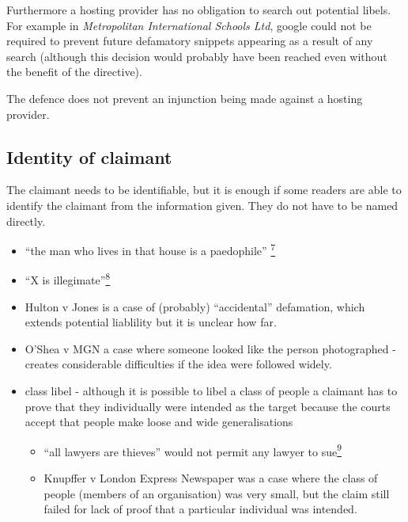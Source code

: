 \documentclass[]{article}
\begin{document}
Furthermore a hosting provider has no obligation to search out potential libels. For example in  \emph{Metropolitan International Schools Ltd}, google could not  be  required to prevent future defamatory snippets appearing as a result
  of any search (although this decision would probably have been reached
  even without the benefit of the directive).

The defence does not prevent an injunction being made against a hosting provider.

\subsection{Identity of claimant}

The claimant needs to be identifiable, but it is enough if some readers
are able to identify the claimant from the information given. They do
not have to be named directly.

\begin{itemize}
\item
  ``{the man who lives in that house is a paedophile''
  \hyperref[sdfootnote7sym]{\textsuperscript{7}}}
\item
  ``{X is illegimate''\hyperref[sdfootnote8sym]{\textsuperscript{8}}}
\item
  Hulton v Jones is a case of (probably) ``accidental'' defamation,
  which extends potential liablility but it is unclear how far.
\item
  O'Shea v MGN a case where someone looked like the person photographed
  - creates considerable difficulties if the idea were followed widely.
\item
  class libel - although it is possible to libel a class of people a
  claimant has to prove that they individually were intended as the
  target because the courts accept that people make loose and wide
  generalisations

  \begin{itemize}
  \item
    ``{all lawyers are thieves'' would not permit any lawyer to
    sue\hyperref[sdfootnote9sym]{\textsuperscript{9}}}
  \item
    Knupffer v London Express Newspaper was a case where the class of
    people (members of an organisation) was very small, but the claim
    still failed for lack of proof that a particular individual was
    intended.
  \end{itemize}
\end{itemize}
\end{document}

